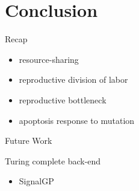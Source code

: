 \section{Conclusion}

\begin{frame}{Recap}

\Large

\begin{itemize}
\item resource-sharing
\item reproductive division of labor
\item reproductive bottleneck
\item apoptosis response to mutation
\end{itemize}

\end{frame}

\begin{frame}{Future Work}

\Large

Turing complete back-end
\begin{itemize}
\item SignalGP \cite{lalejini2018evolving}
\end{itemize}

\end{frame}
